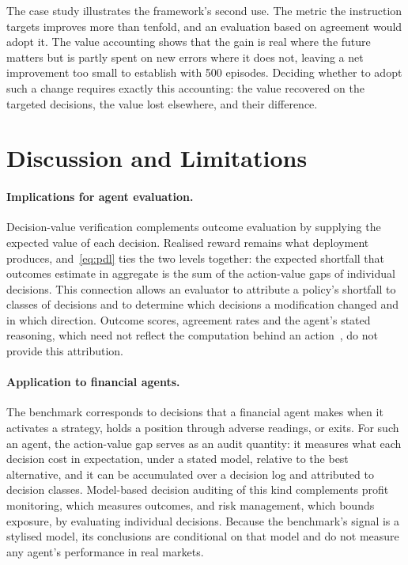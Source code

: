 \documentclass[10pt,a4paper,twocolumn]{article}
\begin{document}
The case study illustrates the framework's second use. The metric the instruction targets improves more than tenfold, and an evaluation based on agreement would adopt it. The value accounting shows that the gain is real where the future matters but is partly spent on new errors where it does not, leaving a net improvement too small to establish with 500 episodes. Deciding whether to adopt such a change requires exactly this accounting: the value recovered on the targeted decisions, the value lost elsewhere, and their difference.

\section{Discussion and Limitations}\label{sec:limits}

\paragraph{Implications for agent evaluation.} Decision-value verification complements outcome evaluation by supplying the expected value of each decision. Realised reward remains what deployment produces, and~\eqref{eq:pdl} ties the two levels together: the expected shortfall that outcomes estimate in aggregate is the sum of the action-value gaps of individual decisions. This connection allows an evaluator to attribute a policy's shortfall to classes of decisions and to determine which decisions a modification changed and in which direction. Outcome scores, agreement rates and the agent's stated reasoning, which need not reflect the computation behind an action~\cite{turpin2023}, do not provide this attribution.

\paragraph{Application to financial agents.} The benchmark corresponds to decisions that a financial agent makes when it activates a strategy, holds a position through adverse readings, or exits. For such an agent, the action-value gap serves as an audit quantity: it measures what each decision cost in expectation, under a stated model, relative to the best alternative, and it can be accumulated over a decision log and attributed to decision classes. Model-based decision auditing of this kind complements profit monitoring, which measures outcomes, and risk management, which bounds exposure, by evaluating individual decisions. Because the benchmark's signal is a stylised model, its conclusions are conditional on that model and do not measure any agent's performance in real markets.
\end{document}

